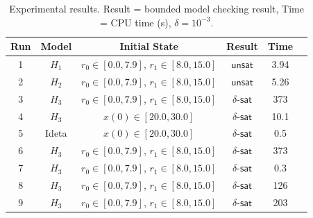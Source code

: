\begin{table}[!th]
  \centering
  \small
  \begin{tabular}{c|c|c|c|c|c}
    \hline
    \hline
    Run & Model & Initial State   & Result   & Time   \\
    \hline
    \hline
    1 & $H_1$ & $r_0 \in [0.0,7.9]$, $r_1 \in [8.0,15.0]$  & $\mathsf{unsat}$  &  3.94 \\
    2 & $H_2$ & $r_0 \in [0.0,7.9]$, $r_1 \in [8.0,15.0]$   & $\mathsf{unsat}$  &  5.26 \\
    3 & $H_3$ & $r_0 \in [0.0,7.9]$, $r_1 \in [8.0,15.0]$   & $\delta$-$\mathsf{sat}$ &  373 \\ 
    4 & $H_3$ & $x(0) \in [20.0,30.0]$   & $\delta$-$\mathsf{sat}$ &  10.1 \\
    5 & Ideta & $x(0) \in [20.0,30.0]$   & $\delta$-$\mathsf{sat}$ &  0.5 \\           
    6 & $H_3$ & $r_0 \in [0.0,7.9]$, $r_1 \in [8.0,15.0]$   & $\delta$-$\mathsf{sat}$ &  373 \\ 
    7 & $H_3$ & $r_0 \in [0.0,7.9]$, $r_1 \in [8.0,15.0]$   & $\delta$-$\mathsf{sat}$ &  0.3 \\ 
    8 & $H_3$ & $r_0 \in [0.0,7.9]$, $r_1 \in [8.0,15.0]$   & $\delta$-$\mathsf{sat}$ &  126 \\ 
    9 & $H_3$ & $r_0 \in [0.0,7.9]$, $r_1 \in [8.0,15.0]$   & $\delta$-$\mathsf{sat}$ & 203 \\ 
    \hline
    \hline
  \end{tabular}
  \caption{%
  Experimental results.
    Result = bounded model checking result,
    Time = CPU time (s),
    $\delta=10^{-3}$.
}\label{tbl:exp}
\end{table}


